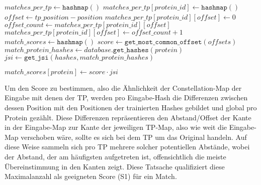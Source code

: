 \begin{enumerate}[a)]
\begin{minipage}{\Width}
\begin{algorithm}[H]
\begin{algorithmic}[1]
                            \State $matches\_per\_tp \gets \texttt{hashmap}()$
                                            \State $matches\_per\_tp[protein\_id] \gets \texttt{hashmap}()$
                                        \EndIf
                                        \State $offset \gets tp\_position - position$
                                            \State $matches\_per\_tp[protein\_id][offset] \gets 0$
                                        \EndIf
                                        \State $offset\_count \gets matches\_per\_tp[protein\_id][offset]$
                                        \State $matches\_per\_tp[protein\_id][offset] \gets offset\_count + 1$
                                    \EndFor
                                \EndIf
                            \EndFor
                            \State $match\_scores \gets \texttt{hashmap}()$
                                \State $score \gets \texttt{get\_most\_common\_offset}(offsets)$
                                \State $match\_protein\_hashes \gets database.\texttt{get\_hashes}(protein)$
                                \State $jsi \gets \texttt{get\_jsi}(hashes, match\_protein\_hashes)$

                                \State $match\_scores[protein] \gets score \cdot jsi$
                            \EndFor
                        \end{algorithmic}
                    \end{algorithm}
                \end{minipage}

                Um den Score zu bestimmen, also die Ähnlichkeit der Constellation-Map der Eingabe mit denen der \ac{TP}, werden pro Eingabe-Hash die Differenzen zwischen dessen Position mit den Positionen der trainierten Hashes gebildet und global pro Protein gezählt. Diese Differenzen repräsentieren den Abstand/Offset der Kante in der Eingabe-Map zur Kante der jeweiligen \ac{TP}-Map, also wie weit die Eingabe-Map verschoben wäre, sollte es sich bei dem \ac{TP} um das Original handeln. Auf diese Weise sammeln sich pro \ac{TP} mehrere solcher potentiellen Abstände, wobei der Abstand, der am häufigsten aufgetreten ist, offensichtlich die meiste Übereinstimmung in den Kanten zeigt. Diese Tatsache qualifiziert diese Maximalanzahl als geeigneten Score (S1) für ein Match.


\end{enumerate}
